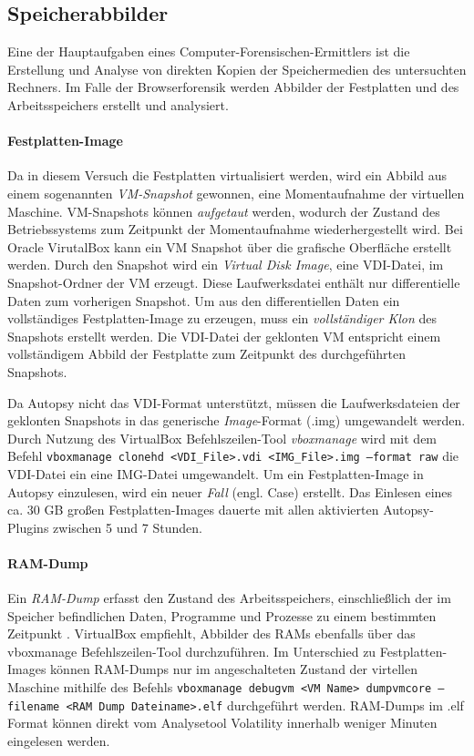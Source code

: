 \subsection*{Speicherabbilder}
\label{subsection:methodik-datensammlung-speicherabbilder}
Eine der Hauptaufgaben eines Computer-Forensischen-Ermittlers ist die Erstellung und Analyse von direkten Kopien der Speichermedien des untersuchten Rechners. \cite{Hassan.2019}
Im Falle der Browserforensik werden Abbilder der Festplatten und des Arbeitsspeichers erstellt und analysiert.

\paragraph*{Festplatten-Image}
Da in diesem Versuch die Festplatten virtualisiert werden, wird ein Abbild aus einem sogenannten \textit{VM-Snapshot} gewonnen, eine Momentaufnahme der virtuellen Maschine. \cite{Oracle.2020} 
VM-Snapshots können \textit{aufgetaut} werden, wodurch der Zustand des Betriebssystems zum Zeitpunkt der Momentaufnahme wiederhergestellt wird.
Bei Oracle VirutalBox kann ein VM Snapshot über die grafische Oberfläche erstellt werden.
Durch den Snapshot wird ein \textit{Virtual Disk Image}, eine VDI-Datei, im Snapshot-Ordner der VM erzeugt. Diese Laufwerksdatei enthält nur differentielle Daten zum vorherigen Snapshot.
Um aus den differentiellen Daten ein vollständiges Festplatten-Image zu erzeugen, muss ein \textit{vollständiger Klon} des Snapshots erstellt werden. Die VDI-Datei der geklonten VM entspricht einem vollständigem Abbild der Festplatte zum Zeitpunkt des durchgeführten Snapshots.

Da Autopsy nicht das VDI-Format unterstützt, müssen die Laufwerksdateien der geklonten Snapshots in das generische \textit{Image}-Format (.img) umgewandelt werden.
Durch Nutzung des VirtualBox Befehlszeilen-Tool \textit{vboxmanage} wird mit dem Befehl \texttt{vboxmanage clonehd <VDI\_File>.vdi <IMG\_File>.img --format raw} die VDI-Datei ein eine IMG-Datei umgewandelt.
Um ein Festplatten-Image in Autopsy einzulesen, wird ein neuer \textit{Fall} (engl. Case) erstellt. Das Einlesen eines ca. 30 GB großen Festplatten-Images dauerte mit allen aktivierten Autopsy-Plugins zwischen 5 und 7 Stunden.

\paragraph*{RAM-Dump}
Ein \textit{RAM-Dump} erfasst den Zustand des Arbeitsspeichers, einschließlich der im Speicher befindlichen Daten, Programme und Prozesse zu einem bestimmten Zeitpunkt \cite{TILT.25.03.2023}.
VirtualBox empfiehlt, Abbilder des RAMs ebenfalls über das vboxmanage Befehlszeilen-Tool durchzuführen.
Im Unterschied zu Festplatten-Images können RAM-Dumps nur im angeschalteten Zustand der virtellen Maschine mithilfe des Befehls \texttt{vboxmanage debugvm <VM Name> dumpvmcore --filename <RAM Dump Dateiname>.elf} durchgeführt werden. RAM-Dumps im .elf Format können direkt vom Analysetool Volatility innerhalb weniger Minuten eingelesen werden.		

